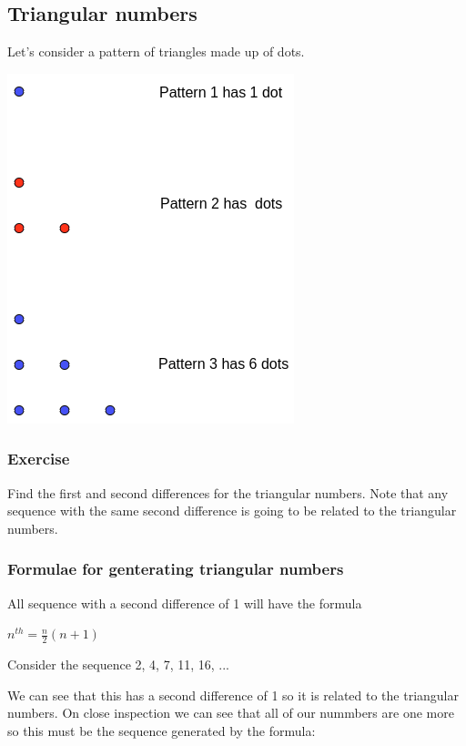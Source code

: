 \subsection{Triangular numbers}
Let's consider a pattern of triangles made up of dots.

\bigskip
  \begin{center}
    \includegraphics[scale=0.5]{./Images/Sequences/Seq_2.png}
  \end{center}
\bigskip

\subsubsection{Exercise}
Find the first and second differences for the triangular numbers.
Note that any sequence with the same second difference is going to be related to the triangular numbers.

\subsubsection{Formulae for genterating triangular numbers}
All sequence with a second difference of 1 will have the formula

\bigskip
  $\displaystyle n^{th}=\frac{n}{2}(n + 1)$
\bigskip

Consider the sequence 2, 4, 7, 11, 16, ...

We can see that this has a second difference of 1 so  it is related to the triangular numbers.  On close inspection we can see that all of our nummbers are one more so this must be the sequence generated by the formula:

